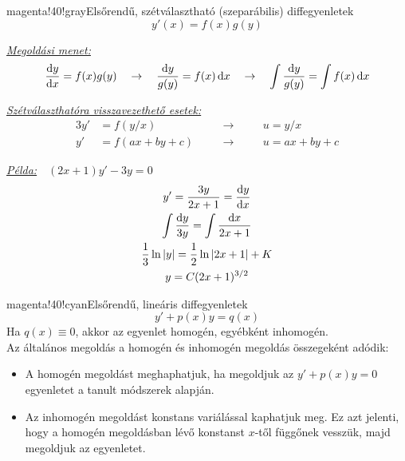 \documentclass[main.tex]{subfiles}
\begin{document}
\begin{cbox}{magenta!40!gray}{Elsőrendű, szétválasztható (szeparábilis) diffegyenletek}
  \[
    y'(x) = f(x)g(y)
  \]

  \emph{\underline{Megoldási menet:}}
  \[
    \derivative{y}{x} = f(x)g(y)
    \quad \rightarrow \quad
    \frac{\differential y}{g(y)} = f(x) \, \differential x
    \quad \rightarrow \quad
    \int \frac{\differential y}{g(y)} = \int f(x) \, \differential x
  \]

  \emph{\underline{Szétválaszthatóra visszavezethető esetek:}}
  \begin{alignat*}{3}
    y'
          & = f(y/x)
    \quad &                  & \rightarrow \quad
          &                  & u = y/x
    \\
    y'
          & = f(ax + by + c)
    \quad &                  & \rightarrow \quad
          &                  & u = ax + by + c
  \end{alignat*}

  \emph{\underline{Példa:}}$\quad (2x+1)y'-3y=0$
  \begin{gather*}
    y' = \frac{3y}{2x + 1} = \derivative{y}{x}
    \\
    \int \frac{\differential y}{3y} = \int \frac{\differential x}{2x + 1}
    \\
    \frac{1}{3} \ln |y| = \frac{1}{2} \ln |2x + 1| + K
    \\
    y = C(2x + 1)^{3/2}
  \end{gather*}
\end{cbox}

\begin{cbox}{magenta!40!cyan}{Elsőrendű, lineáris diffegyenletek}
  \[
    y' + p(x) y = q(x)
  \]
  Ha $q(x) \equiv 0 $, akkor az egyenlet homogén, egyébként inhomogén.
  \\[2mm]
  Az általános megoldás a homogén és inhomogén megoldás
  összegeként adódik:
  \begin{itemize}
    \item A homogén megoldást meghaphatjuk, ha megoldjuk az
          $y' + p(x)y = 0$ egyenletet a tanult módszerek alapján.

    \item Az inhomogén megoldást konstans variálással
          kaphatjuk meg. Ez azt jelenti, hogy a homogén megoldásban
          lévő konstanst $x$-től függőnek vesszük, majd megoldjuk
          az egyenletet.
  \end{itemize}
\end{cbox}
\end{document}
